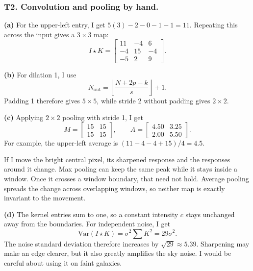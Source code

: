 \documentclass[11pt]{article}
\begin{document}
\subsubsection*{T2. Convolution and pooling by hand.}

\textbf{(a)} For the upper-left entry, I get $5(3)-2-0-1-1=11$. Repeating this across the input gives a $3\times3$ map:
\begin{equation}
I\star K=\begin{bmatrix}11&-4&6\\-4&15&-4\\-5&2&9\end{bmatrix}.
\end{equation}

\textbf{(b)} For dilation 1, I use
\begin{equation}
N_{\mathrm{out}}=\left\lfloor\frac{N+2p-k}{s}\right\rfloor+1.
\end{equation}
Padding 1 therefore gives $5\times5$, while stride 2 without padding gives $2\times2$.

\textbf{(c)} Applying $2\times2$ pooling with stride 1, I get
\begin{equation}
M=\begin{bmatrix}15&15\\15&15\end{bmatrix},\qquad
A=\begin{bmatrix}4.50&3.25\\2.00&5.50\end{bmatrix}.
\end{equation}
For example, the upper-left average is $(11-4-4+15)/4=4.5$.

If I move the bright central pixel, its sharpened response and the responses around it change. Max pooling can keep the same peak while it stays inside a window. Once it crosses a window boundary, that need not hold. Average pooling spreads the change across overlapping windows, so neither map is exactly invariant to the movement.

\textbf{(d)} The kernel entries sum to one, so a constant intensity $c$ stays unchanged away from the boundaries. For independent noise, I get
\begin{equation}
\mathrm{Var}(I\star K)=\sigma^2\sum K^2=29\sigma^2.
\end{equation}
The noise standard deviation therefore increases by $\sqrt{29}\approx5.39$. Sharpening may make an edge clearer, but it also greatly amplifies the sky noise. I would be careful about using it on faint galaxies.
\end{document}
